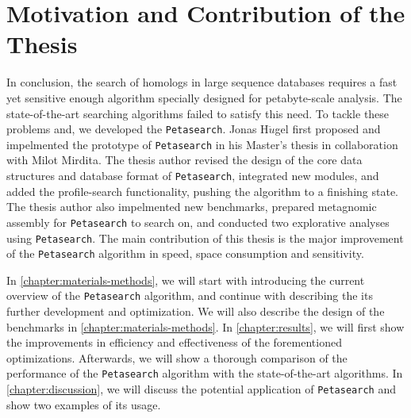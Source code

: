 \section{Motivation and Contribution of the Thesis}

In conclusion, the search of homologs in large sequence databases requires a fast yet sensitive enough algorithm specially designed for petabyte-scale analysis.
The state-of-the-art searching algorithms failed to satisfy this need.
To tackle these problems and, we developed the \texttt{Petasearch}.
Jonas H{$\ddot{u}$}gel first proposed and impelmented the prototype of \texttt{Petasearch} in his Master's thesis in collaboration with Milot Mirdita.
The thesis author revised the design of the core data structures and database format of \texttt{Petasearch}, integrated new modules, and added the profile-search functionality, pushing the algorithm to a finishing state.
The thesis author also impelmented new benchmarks, prepared metagnomic assembly for \texttt{Petasearch} to search on, and conducted two explorative analyses using \texttt{Petasearch}.
The main contribution of this thesis is the major improvement of the \texttt{Petasearch} algorithm in speed, space consumption and sensitivity.

In \cref{chapter:materials-methods}, we will start with introducing the current overview of the \texttt{Petasearch} algorithm, and continue with describing the its further development and optimization.
We will also describe the design of the benchmarks in \cref{chapter:materials-methods}.
In \cref{chapter:results}, we will first show the improvements in efficiency and effectiveness of the forementioned optimizations.
Afterwards, we will show a thorough comparison of the performance of the \texttt{Petasearch} algorithm with the state-of-the-art algorithms.
In \cref{chapter:discussion}, we will discuss the potential application of \texttt{Petasearch} and show two examples of its usage.


